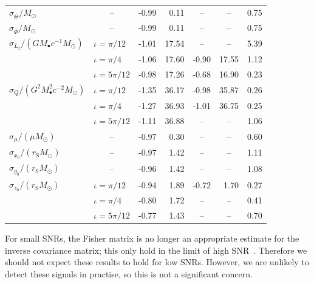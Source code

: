 \documentclass[useAMS,usedcolumn,usegraphicx,usenatbib]{mn2e}
\begin{document}
\begin{table}
\begin{minipage}{0.65\textwidth}
\begin{tabular}{@{} l l D{.}{.}{2.2} D{.}{.}{2.2} D{.}{.}{2.2} D{.}{.}{2.2} D{.}{.}{1.2} @{}}
 $\hat{\sigma}_{\overline{\Theta}}/M_\odot$ &  & -0.99 & 0.11 &  &  & 0.75  \\
 $\hat{\sigma}_{\overline{\Phi}}/M_\odot$ &  &  -0.99 & 0.11 &  &  & 0.75 \\
 $\hat{\sigma}_{L_z}/\left(G M_\bullet c^{-1} M_\odot\right)$ & $\iota = \pi/12$ & -1.01 & 17.54 &  &  & 5.39 \\
  & $\iota = \pi/4$ & -1.06 & 17.60 & -0.90 & 17.55 & 1.12 \\
  & $\iota = 5\pi/12$ & -0.98 & 17.26 & -0.68 & 16.90 & 0.23 \\
 $\hat{\sigma}_Q/\left(G^2 M_\bullet^2 c^{-2}M_\odot\right)$ & $\iota = \pi/12$ & -1.35 & 36.17 & -0.98 & 35.87 & 0.26 \\
  & $\iota = \pi/4$ & -1.27 & 36.93 & -1.01 & 36.75 & 0.25 \\
  & $\iota = 5\pi/12$ & -1.11 & 36.88 &  &  & 1.06 \\
 $\hat{\sigma}_\mu/(\mu M_\odot)$ &  & -0.97 & 0.30 &  &  & 0.60 \\
 $\hat{\sigma}_{x_0}/\left(r_\mathrm{S} M_\odot\right)$ &  & -0.97 & 1.42 &  &  & 1.11 \\
 $\hat{\sigma}_{y_0}/\left(r_\mathrm{S} M_\odot\right)$ &  & -0.96 & 1.42 &  &  & 1.08 \\
 $\hat{\sigma}_{z_0}/\left(r_\mathrm{S} M_\odot\right)$  & $\iota = \pi/12$ & -0.94 & 1.89 & -0.72 & 1.70 & 0.27 \\
  & $\iota = \pi/4$ & -0.80 & 1.72 &  &  & 0.41 \\
  & $\iota = 5\pi/12$ & -0.77 & 1.43 &  &  & 0.70 \\
 \hline
 \end{tabular}
\end{minipage}
\end{table}

For small SNRs, the Fisher matrix is no longer an appropriate estimate for the inverse covariance matrix; this only hold in the limit of high SNR~\cite{Vallisneri2008}. Therefore we should not expect these results to hold for low SNRs. However, we are unlikely to detect these signals in practise, so this is not a significant concern.
\end{document}
